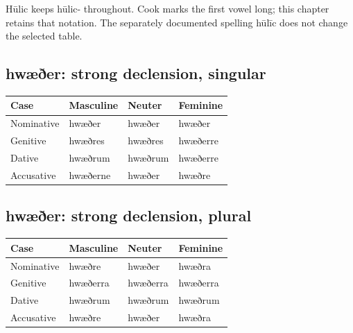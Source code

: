 Hūlic keeps hūlic- throughout. Cook marks the first vowel long; this chapter retains that notation. The separately documented spelling hūlīc does not change the selected table.

\subsection*{hwæðer: strong declension, singular}

\par\begingroup
\fontsize{10.5}{13.2}\selectfont
\setlength{\LTleft}{0pt}\setlength{\LTright}{\fill}
\noindent
\begin{tabular}{@{}>{\raggedright\arraybackslash}p{28.89mm}>{\raggedright\arraybackslash}p{28.89mm}>{\raggedright\arraybackslash}p{28.89mm}>{\raggedright\arraybackslash}p{28.89mm}@{}}
\toprule
\textbf{Case} & \textbf{Masculine} & \textbf{Neuter} & \textbf{Feminine} \\
\midrule
Nominative & hwæðer & hwæðer & hwæðer \\
Genitive & hwæðres & hwæðres & hwæðerre \\
Dative & hwæðrum & hwæðrum & hwæðerre \\
Accusative & hwæðerne & hwæðer & hwæðre \\
\bottomrule
\end{tabular}
\par\endgroup

\subsection*{hwæðer: strong declension, plural}

\par\begingroup
\fontsize{10.5}{13.2}\selectfont
\setlength{\LTleft}{0pt}\setlength{\LTright}{\fill}
\noindent
\begin{tabular}{@{}>{\raggedright\arraybackslash}p{28.89mm}>{\raggedright\arraybackslash}p{28.89mm}>{\raggedright\arraybackslash}p{28.89mm}>{\raggedright\arraybackslash}p{28.89mm}@{}}
\toprule
\textbf{Case} & \textbf{Masculine} & \textbf{Neuter} & \textbf{Feminine} \\
\midrule
Nominative & hwæðre & hwæðer & hwæðra \\
Genitive & hwæðerra & hwæðerra & hwæðerra \\
Dative & hwæðrum & hwæðrum & hwæðrum \\
Accusative & hwæðre & hwæðer & hwæðra \\
\bottomrule
\end{tabular}
\par\endgroup

